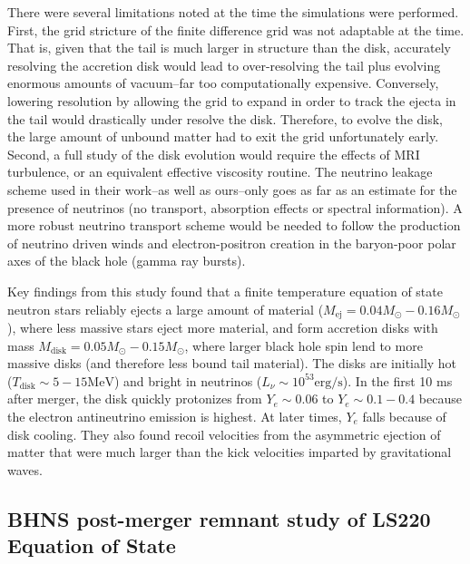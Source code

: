 There were several limitations noted at the time the simulations were performed.
First, the grid stricture of the finite difference grid was not adaptable at the time.  
That is, given that the tail is much larger in structure than the disk, accurately resolving the accretion disk would lead to over-resolving the tail plus evolving enormous amounts of vacuum--far too computationally expensive.
Conversely, lowering resolution by allowing the grid to expand in order to track the ejecta in the tail would drastically under resolve the disk.  
Therefore, to evolve the disk, the large amount of unbound matter had to exit the grid unfortunately early.  Second, a full study of the disk evolution would require the effects of MRI turbulence, or an equivalent effective viscosity routine.
The neutrino leakage scheme used in their work--as well as ours--only goes as far as an estimate for the presence of neutrinos (no transport, absorption effects or spectral information).
A more robust neutrino transport scheme would be needed to follow the production of neutrino driven winds and electron-positron creation in the baryon-poor polar axes of the black hole (gamma ray bursts).

Key findings from this study found that a finite temperature equation of state neutron stars reliably ejects a large amount of material ($M_\textrm{ej} = 0.04 M_\odot -  0.16 M_\odot$), where less massive stars eject more material, and form accretion disks with mass $M_\textrm{disk} = 0.05 M_\odot -  0.15 M_\odot$, where larger black hole spin lend to more massive disks (and therefore less bound tail material).
The disks are initially hot ($T_\textrm{disk} \sim 5-15 \textrm{MeV}$) and bright in neutrinos ($L_\nu \sim 10^{53} \textrm{erg/s}$).
In the first 10 ms after merger, the disk quickly protonizes from $Y_e \sim 0.06$ to $Y_e \sim 0.1 - 0.4$ because the electron antineutrino emission is highest.  
At later times, $Y_e$ falls because of disk cooling.
They also found recoil velocities from the asymmetric ejection of matter that were much larger than the kick velocities imparted by gravitational waves.

\subsection{BHNS post-merger remnant study of LS220 Equation of State}

